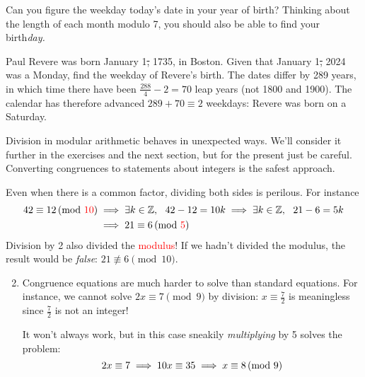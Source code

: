 Can you figure the weekday today's date in your year of birth? Thinking about the length of each month modulo 7, you should also be able to find your birth\emph{day.}

\begin{example}{}{}
	Paul Revere was born January 1\st, 1735, in Boston. Given that January 1\st, 2024 was a Monday, find the weekday of Revere's birth.\smallbreak
	The dates differ by 289 years, in which time there have been $\frac{288}4-2=70$ leap years (not 1800 and 1900). The calendar has therefore advanced $289+70\equiv 2$ weekdays: Revere was born on a Saturday.
\end{example}



Division in modular arithmetic behaves in unexpected ways. We'll consider it further in the exercises and the next section, but for the present just be careful. Converting congruences to statements about integers is the safest approach.

\begin{examples}{}{}
	\exstart Even when there is a common factor, dividing both sides is perilous. For instance
	\begin{align*}
		42\equiv 12\negthickspace\pmod{\textcolor{red}{10}}&\implies \exists k\in\mathbb{Z},\ \ 42-12=10k \implies \exists k\in\mathbb{Z},\ \ 21-6=5k\\
		&\implies 21\equiv 6\negthickspace\pmod{\textcolor{red}{5}}
	\end{align*}
	Division by 2 also divided the \textcolor{red}{modulus}! If we hadn't divided the modulus, the result would be \emph{false}: $21\not\equiv 6\pmod{10}$.
	
		
		\begin{enumerate}\setcounter{enumi}{1}
		  \item Congruence equations are much harder to solve than standard equations. For instance, we cannot solve $2x\equiv 7\pmod 9$ by division: $x\equiv \frac 72$ is meaningless since $\frac 72$ is not an integer!\par 			It won't always work, but in this case sneakily \emph{multiplying} by 5 solves the problem:
			\[
				2x\equiv 7\implies 10x\equiv 35\implies x\equiv 8\negthickspace\pmod{9}
			\]
\end{enumerate}
\end{examples}


